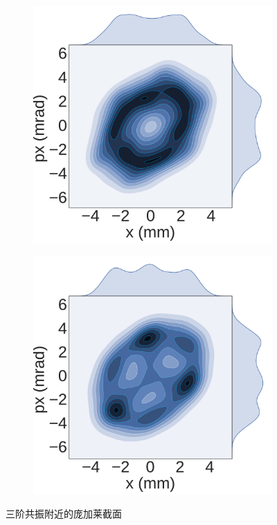 \begin{figure}[!htb]
\begin{subfigure}[b]{0.48\textwidth}
        \caption{}
    \end{subfigure}
    \begin{subfigure}[b]{0.48\textwidth}
        \includegraphics[width=\textwidth]{plot/particle_contour_nlevel9/sptc00003_xpx.pdf}
        \caption{}
    \end{subfigure}
    \begin{subfigure}[b]{0.48\textwidth}
        \includegraphics[width=\textwidth]{plot/particle_contour_nlevel9/sptc00006_xpx.pdf}
        \caption{}
    \end{subfigure}
    \caption{三阶共振附近的庞加莱截面}\label{fig:Poincare}
\end{figure}

